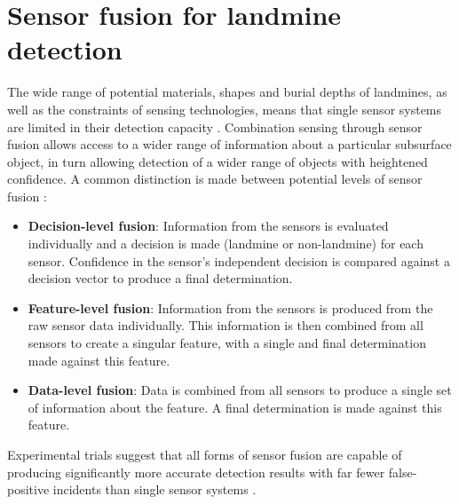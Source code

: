 \documentclass[main.tex]{subfiles}
\begin{document}

\section{Sensor fusion for landmine detection}
The wide range of potential materials, shapes and burial depths of landmines, as well as the constraints of sensing technologies, means that single sensor systems are limited in their detection capacity \parencite{Yarovoy2009}. Combination sensing through sensor fusion allows access to a wider range of information about a particular subsurface object, in turn allowing detection of a wider range of objects with heightened confidence. 
A common distinction is made between potential levels of sensor fusion \parencite{Yarovoy2009}:
\begin{itemize}
\item \textbf{Decision-level fusion}: Information from the sensors is evaluated individually and a decision is made (landmine or non-landmine) for each sensor. Confidence in the sensor's independent decision is compared against a decision vector to produce a final determination.
\item \textbf{Feature-level fusion}: Information from the sensors is produced from the raw sensor data individually. This information is then combined from all sensors to create a singular feature, with a single and final determination made against this feature. 
\item \textbf{Data-level fusion}: Data is combined from all sensors to produce a single set of information about the feature. A final determination is made against this feature.
\end{itemize}
Experimental trials suggest that all forms of sensor fusion are capable of producing significantly more accurate detection results with far fewer false-positive incidents than single sensor systems \parencite{Yarovoy2009}. 
\end{document}
